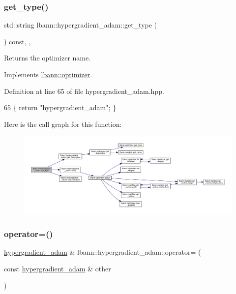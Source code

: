 \subsubsection{\texorpdfstring{get\+\_\+type()}{get\_type()}}
{\footnotesize\ttfamily std\+::string lbann\+::hypergradient\+\_\+adam\+::get\+\_\+type (\begin{DoxyParamCaption}{ }\end{DoxyParamCaption}) const\hspace{0.3cm}{\ttfamily [inline]}, {\ttfamily [override]}, {\ttfamily [virtual]}}

Returns the optimizer name. 

Implements \hyperlink{classlbann_1_1optimizer_a7b7a6814e14eeee157e1cbb7f15dd4ff}{lbann\+::optimizer}.



Definition at line 65 of file hypergradient\+\_\+adam.\+hpp.


\begin{DoxyCode}
65 \{ \textcolor{keywordflow}{return} \textcolor{stringliteral}{"hypergradient\_adam"}; \}
\end{DoxyCode}
Here is the call graph for this function\+:\nopagebreak
\begin{figure}[H]
\begin{center}
\leavevmode
\includegraphics[width=350pt]{classlbann_1_1hypergradient__adam_a21ba2e54a7c803c10ab8354d0552ba82_cgraph}
\end{center}
\end{figure}
\mbox{\label{classlbann_1_1hypergradient__adam_aab8df6bbd256c9731dc1e5b8eac286ec}} 
\subsubsection{\texorpdfstring{operator=()}{operator=()}}
{\footnotesize\ttfamily \hyperlink{classlbann_1_1hypergradient__adam}{hypergradient\+\_\+adam} \& lbann\+::hypergradient\+\_\+adam\+::operator= (\begin{DoxyParamCaption}\item[{const \hyperlink{classlbann_1_1hypergradient__adam}{hypergradient\+\_\+adam} \&}]{other }\end{DoxyParamCaption})}

